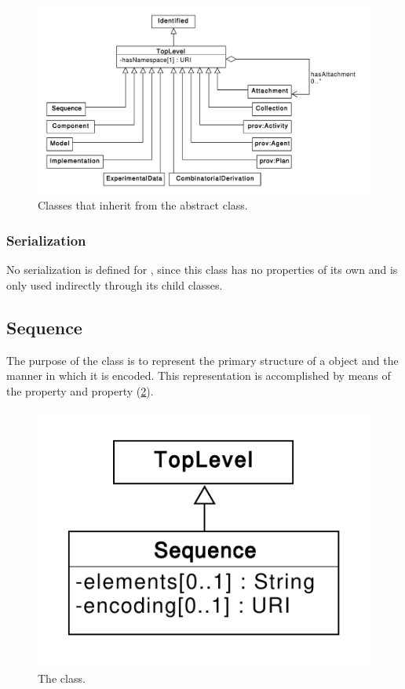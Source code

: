 \begin{figure}[ht]
\begin{center}
\includegraphics[width=\textwidth]{uml/toplevel}
\caption[]{Classes that inherit from the  abstract class.}
\label{uml:toplevel}
\end{center}
\end{figure}

\subsubsection*{Serialization}

No serialization is defined for , since this class has
no properties of its own and is only used indirectly through its child
classes.

\subsection{Sequence}
\label{sec:Sequence}
The purpose of the  class is to represent the primary structure of a  object and the manner in which it is encoded. This representation is accomplished  by means of the  property and  property (\ref{uml:sequence}).

\begin{figure}[ht]
\begin{center}
\includegraphics[scale=0.6]{uml/sequence}
\caption[]{The  class.}
\label{uml:sequence}
\end{center}
\end{figure}


